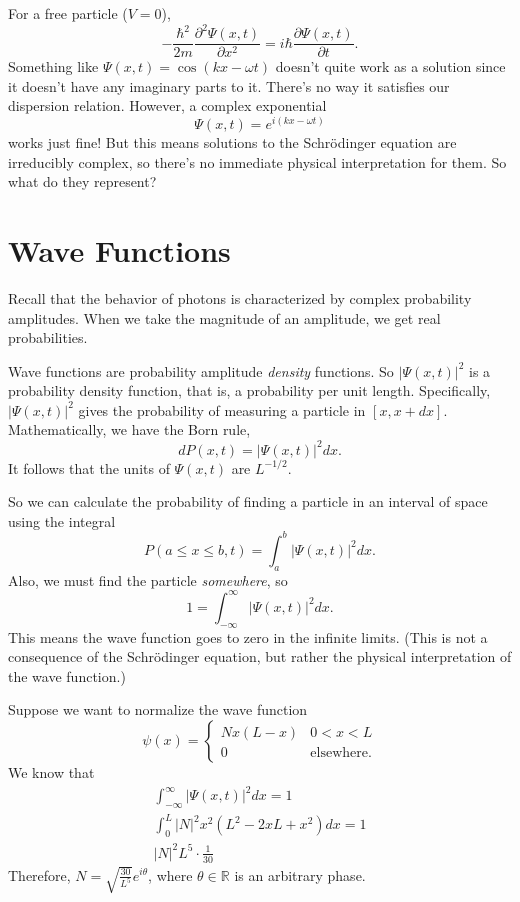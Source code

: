 \documentclass[../p052main.tex]{subfiles}
\begin{document}
For a free particle ($V = 0$),
\[ -\frac{\hbar^2}{2m} \frac{\partial^2 \Psi(x,t)}{\partial x^2} = i \hbar \frac{\partial \Psi(x,t)}{\partial t}. \]
Something like $\Psi(x,t) = \cos (kx - \omega t)$ doesn't quite work as a solution since it doesn't have any imaginary parts to it.
There's no way it satisfies our dispersion relation.
However, a complex exponential
\[ \Psi(x,t) = e^{i(kx - \omega t)} \]
works just fine!
But this means solutions to the Schrödinger equation are irreducibly complex, so there's no immediate physical interpretation for them.
So what do they represent?

\section{Wave Functions}
Recall that the behavior of photons is characterized by complex probability amplitudes.
When we take the magnitude of an amplitude, we get real probabilities.

Wave functions are probability amplitude \textit{density} functions.
So $|\Psi (x,t)|^2$ is a probability density function, that is, a probability per unit length.
Specifically, $|\Psi(x,t)|^2$ gives the probability of measuring a particle in $[x, x + dx]$.
Mathematically, we have the Born rule,
\[ dP(x,t) = |\Psi(x,t)|^2 dx. \]
It follows that the units of $\Psi(x,t)$ are $L^{-1/2}$.

So we can calculate the probability of finding a particle in an interval of space using the integral
\[ P(a \leq x \leq b, t) = \int_a^b |\Psi(x,t)|^2dx. \]
Also, we must find the particle \textit{somewhere}, so
\[ 1 = \int_{-\infty}^\infty |\Psi(x,t)|^2dx. \]
This means the wave function goes to zero in the infinite limits.
(This is not a consequence of the Schrödinger equation, but rather the physical interpretation of the wave function.)

\begin{example}
    Suppose we want to normalize the wave function
    \[ \psi(x) = \begin{cases} Nx(L-x) & 0 < x < L \\ 0 & \text{elsewhere}. \end{cases} \]
    We know that
    \begin{align*}
        \int_{-\infty}^\infty |\Psi(x,t)|^2dx = 1 \\
        \int_0^L |N|^2 x^2 (L^2 - 2xL + x^2)dx = 1 \\
        |N|^2 L^5 \cdot \frac{1}{30}
    \end{align*}
    Therefore, $N = \sqrt{\frac{30}{L^5}} e^{i\theta}$, where $\theta \in \mathbb{R}$ is an arbitrary phase.
\end{example}
\end{document}
